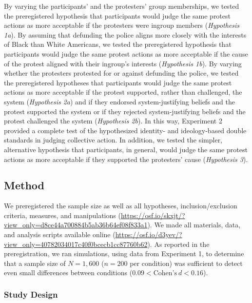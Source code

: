 \documentclass[twocolumn, 11pt, letterpaper]{article}
\begin{document}
By varying the participants' and the protesters' group memberships, we
tested the preregistered hypothesis that participants would judge the
same protest actions as more acceptable if the protesters were ingroup
members (\emph{Hypothesis 1a}). By assuming that defunding the police
aligns more closely with the interests of Black than White Americans, we
tested the preregistered hypothesis that participants would judge the
same protest actions as more acceptable if the cause of the protest
aligned with their ingroup's interests (\emph{Hypothesis 1b}). By
varying whether the protesters protested for or against defunding the
police, we tested the preregistered hypotheses that participants would
judge the same protest actions as more acceptable if the protest
supported, rather than challenged, the system (\emph{Hypothesis 2a}) and
if they endorsed system-justifying beliefs and the protest supported the
system or if they rejected system-justifying beliefs and the protest
challenged the system (\emph{Hypothesis 2b}). In this way, Experiment 2
provided a complete test of the hypothesized identity- and
ideology-based double standards in judging collective action. In
addition, we tested the simpler, alternative hypothesis that
participants, in general, would judge the same protest actions as more
acceptable if they supported the protesters' cause (\emph{Hypothesis
3}).

\hypertarget{method-1}{%
\subsection{Method}\label{method-1}}

We preregistered the sample size as well as all hypotheses,
inclusion/exclusion criteria, measures, and manipulations
(\url{https://osf.io/skxjt/?view_only=d8ce44a700884b5ab36b64ef08f833a1}).
We made all materials, data, and analysis scripts available online
(\url{https://osf.io/d3yev/?view_only=40782034017c40f0bcecb1cc87760b62}).
As reported in the preregistration, we ran simulations, using data from
Experiment 1, to determine that a sample size of \(N = 1,600\)
(\(n = 200\) per condition) was sufficient to detect even small
differences between conditions (\(0.09 < \text{Cohen's}~d < 0.16\)).

\hypertarget{study-design-1}{%
\subsubsection{Study Design}\label{study-design-1}}
\end{document}
